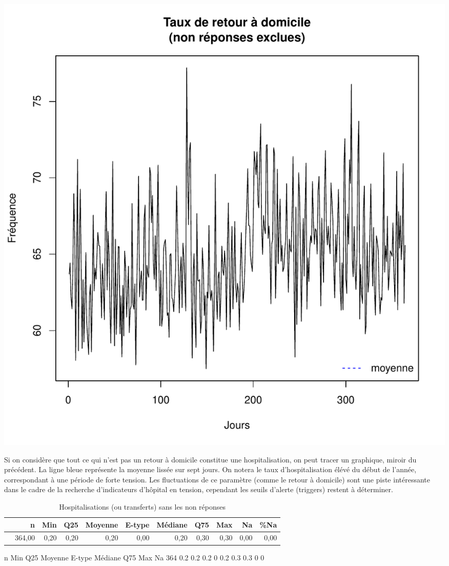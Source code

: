 \documentclass[12pt,english,french,twoside]{book}\usepackage[]{graphicx}\usepackage[]{color}
\makeatletter
\def\maxwidth{ %
  \ifdim\Gin@nat@width>\linewidth
    \linewidth
  \else
    \Gin@nat@width
  \fi
}
\makeatother
\begin{document}
\includegraphics[width=\maxwidth]{figure/retour_dom2-1} 


Si on considère que tout ce qui n'est pas un retour à domicile constitue une hospitalisation, on peut tracer un graphique, miroir du précédent. La ligne bleue représente la moyenne lissée sur sept jours. On notera le taux d'hospitalisation élévé du début de l'année, correspondant à une période de forte tension. Les fluctuations de ce paramètre (comme le retour à domicile) sont une piste intéressante dans le cadre de la recherche d'indicateurs d'hôpital en tension, cependant les seuils d'alerte (triggers) restent à déterminer.

\begin{table}[ht]
\centering
\begin{tabular}{rrrrrrrrrrr}
  \hline
 & n & Min & Q25 & Moyenne & E-type & Médiane & Q75 & Max & Na & \%Na \\ 
  \hline
 & 364,00 & 0,20 & 0,20 & 0,20 & 0,00 & 0,20 & 0,30 & 0,30 & 0,00 & 0,00 \\ 
   \hline
\end{tabular}
\caption[Hospitalisations]{Hospitalisations (ou transferts) sans les non réponses} 
\label{tab:hosp}
\end{table}
   n Min Q25 Moyenne E-type Médiane Q75 Max Na %
 364 0.2 0.2     0.2      0     0.2 0.3 0.3  0   0
\end{document}
